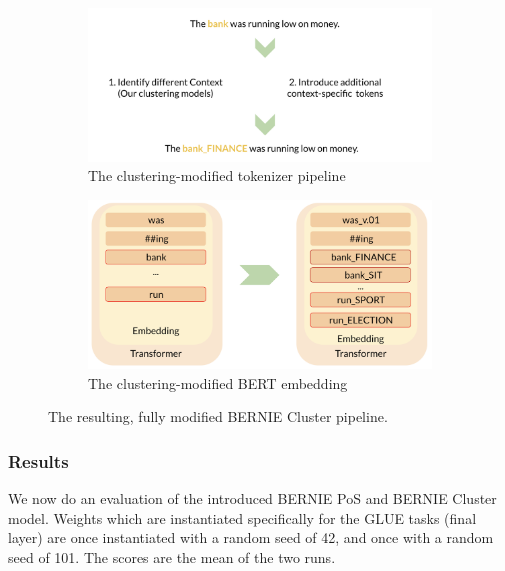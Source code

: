 \documentclass[a4paper,12pt,oneside,openright]{report}
\begin{document}
\begin{figure}
\center
\begin{subfigure}{.54\textwidth}
  \centering
  \includegraphics[width=\linewidth]{./assets/experiments/pipeline_tokenizer_BERnie_meaning.png}
  \caption{The clustering-modified tokenizer pipeline}
  \label{fig:sfig1}
\end{subfigure}%
\begin{subfigure}{.5\textwidth}
  \centering
  \includegraphics[width=\linewidth]{./assets/experiments/pipeline_model_BERnie_meaning_embedding.png}
  \caption{The clustering-modified BERT embedding}
  \label{fig:sfig2}
\end{subfigure}
\caption{The resulting, fully modified BERNIE Cluster pipeline.}
\label{fig:fig}
\end{figure}


\subsubsection{Results}

We now do an evaluation of the introduced BERNIE PoS and BERNIE Cluster model.
Weights which are instantiated specifically for the GLUE tasks (final layer) are once instantiated with a random seed of 42, and once with a random seed of 101.
The scores are the mean of the two runs.
\end{document}
